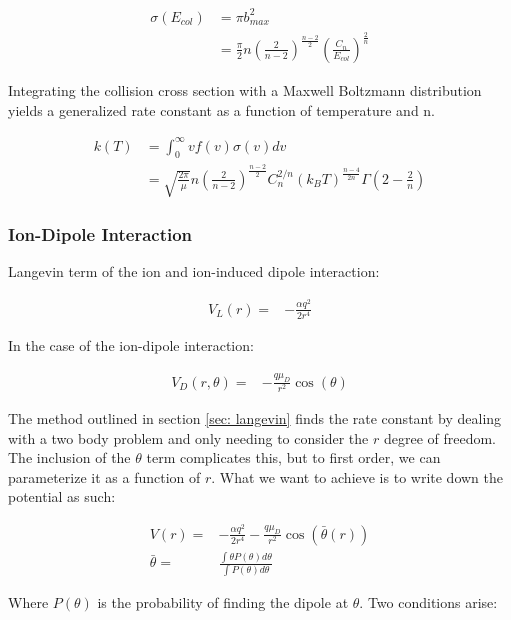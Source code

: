 \documentclass[a4paper]{article}
\begin{document}
\begin{align*}
    \sigma(E_{col}) & = \pi b^2_{max} \\
    & = \frac{\pi}{2} n \left(\frac{2}{n-2}\right)^{\frac{n-2}{2}} \left(\frac{C_n}{E_{col}}\right)^{\frac{2}{n}}
\end{align*}

Integrating the collision cross section with a Maxwell Boltzmann distribution yields a generalized rate constant as a function of temperature and n.

\begin{align}
    k(T) & = \int_0^{\infty} v f(v) \sigma(v) dv \label{eq: k int} \\
    & = \boxed{\sqrt{\frac{2 \pi}{\mu}}n\left(\frac{2}{n-2}\right)^{\frac{n-2}{2}}C_n^{2/n}(k_B T)^{\frac{n-4}{2n}}\Gamma\left(2-\frac{2}{n}\right)} \nonumber
\end{align}

\subsubsection{Ion-Dipole Interaction}

Langevin term of the ion and ion-induced dipole interaction:

\begin{align}
V_L(r)= &-\frac{\alpha q^2}{2r^4}
\end{align}

In the case of the ion-dipole interaction:

\begin{align}
V_D(r, \theta) = & -\frac{q\mu_D}{r^2} \cos(\theta)
\end{align}

The method outlined in section \ref{sec: langevin} finds the rate constant by dealing with a two body problem and only needing to consider the $r$ degree of freedom. The inclusion of the $\theta$ term complicates this, but to first order, we can parameterize it as a function of $r$. What we want to achieve is to write down the potential as such:

\begin{align}
    V(r) =& -\frac{\alpha q^2}{2r^4} - \frac{q\mu_D}{r^2} \cos\left(\bar{\theta}(r)\right) \nonumber \\
    \bar{\theta} = & \frac{\int \theta P(\theta) d\theta}{\int P(\theta) d\theta} \label{eq: avg theta}
\end{align}

Where $P(\theta)$ is the probability of finding the dipole at $\theta$. Two conditions arise:
\end{document}
